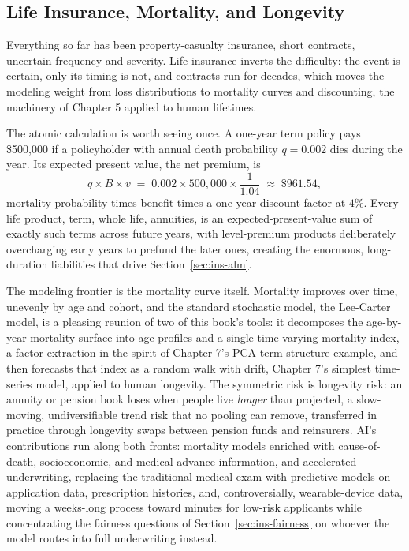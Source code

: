 \documentclass[../ai_in_finance]{subfiles}
\begin{document}
\subsection{Life Insurance, Mortality, and Longevity}
\label{sec:ins-life}

Everything so far has been property-casualty insurance, short contracts, uncertain frequency and severity. Life insurance inverts the difficulty: the event is certain, only its timing is not, and contracts run for decades, which moves the modeling weight from loss distributions to mortality curves and discounting, the machinery of Chapter 5 applied to human lifetimes.

The atomic calculation is worth seeing once. A one-year term policy pays \$500{,}000 if a policyholder with annual death probability $q = 0.002$ dies during the year. Its expected present value, the net premium, is
\begin{equation*}
q \times B \times v \;=\; 0.002 \times 500{,}000 \times \frac{1}{1.04} \;\approx\; \$961.54,
\end{equation*}
mortality probability times benefit times a one-year discount factor at $4\%$. Every life product, term, whole life, annuities, is an expected-present-value sum of exactly such terms across future years, with level-premium products deliberately overcharging early years to prefund the later ones, creating the enormous, long-duration liabilities that drive Section~\ref{sec:ins-alm}.

The modeling frontier is the mortality curve itself. Mortality improves over time, unevenly by age and cohort, and the standard stochastic model, the Lee-Carter model, is a pleasing reunion of two of this book's tools: it decomposes the age-by-year mortality surface into age profiles and a single time-varying mortality index, a factor extraction in the spirit of Chapter 7's PCA term-structure example, and then forecasts that index as a random walk with drift, Chapter 7's simplest time-series model, applied to human longevity. The symmetric risk is longevity risk: an annuity or pension book loses when people live \emph{longer} than projected, a slow-moving, undiversifiable trend risk that no pooling can remove, transferred in practice through longevity swaps between pension funds and reinsurers. AI's contributions run along both fronts: mortality models enriched with cause-of-death, socioeconomic, and medical-advance information, and accelerated underwriting, replacing the traditional medical exam with predictive models on application data, prescription histories, and, controversially, wearable-device data, moving a weeks-long process toward minutes for low-risk applicants while concentrating the fairness questions of Section~\ref{sec:ins-fairness} on whoever the model routes into full underwriting instead.
\end{document}
